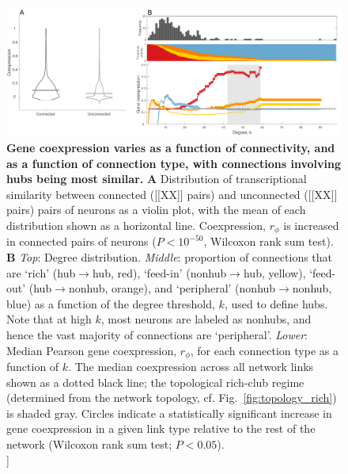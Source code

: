 \documentclass[10pt,letterpaper]{article}
\begin{document}
 \begin{figure}[h]
 \centering
    \includegraphics[width=1\textwidth]{MeanCoexpression2.pdf}
 \caption{{\bf Gene coexpression varies as a function of connectivity, and as a function of connection type, with connections involving hubs being most similar.}
\textbf{A} Distribution of transcriptional similarity between connected ([[XX]] pairs) and unconnected ([[XX]] pairs) pairs of neurons as a violin plot, with the mean of each distribution shown as a horizontal line.
Coexpression, $r_\phi$ is increased in connected pairs of neurons ($P < 10^{-50}$, Wilcoxon rank sum test).
\textbf{B}
\emph{Top}: Degree distribution.
\emph{Middle}: proportion of connections that are `rich' (hub$\rightarrow$hub, red), `feed-in' (nonhub$\rightarrow$hub, yellow), `feed-out' (hub$\rightarrow$nonhub, orange), and `peripheral' (nonhub$\rightarrow$nonhub, blue) as a function of the degree threshold, $k$, used to define hubs.
Note that at high $k$, most neurons are labeled as nonhubs, and hence the vast majority of connections are `peripheral'.
\emph{Lower}: Median Pearson gene coexpression, $r_\phi$, for each connection type as a function of $k$.
The median coexpression across all network links shown as a dotted black line; the topological rich-club regime (determined from the network topology, cf. Fig.~\ref{fig:topology_rich}) is shaded gray.
Circles indicate a statistically significant increase in gene coexpression in a given link type relative to the rest of the network (Wilcoxon rank sum test; $P < 0.05$).\\
[[TODO: A: add $r_\phi$ to ylabel. Perhaps we want to use different colors (confusing: we shouldn't use red for both connected and rich within the same plot; same for blue, should be just peripheral, not peripheral and unconnected).
B: Remove box from degree distribution, Change y-label to `Median gene coexpression', fonts are small, and inconsistent sizes between subplots. I think we should crop the curves when there are fewer than X connections remaining -- in this case it's a bit ridiculous to show that constant feed-out/feed-in/peripheral coexpression when there are only two neurons left as hubs]]}
 \label{fig:coExp}
\end{figure}
\end{document}
